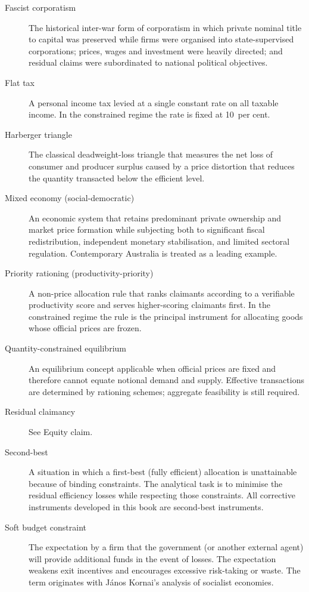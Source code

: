 \documentclass[12pt,anyside]{book}
\theoremstyle{definition}
\theoremstyle{plain}
\theoremstyle{remark}
\begin{document}
\begin{description}
\item[Fascist corporatism]  
The historical inter-war form of corporatism in which private nominal title to capital was preserved while firms were organised into state-supervised corporations; prices, wages and investment were heavily directed; and residual claims were subordinated to national political objectives.

\item[Flat tax]  
A personal income tax levied at a single constant rate on all taxable income. In the constrained regime the rate is fixed at 10~per cent.

\item[Harberger triangle]  
The classical deadweight-loss triangle that measures the net loss of consumer and producer surplus caused by a price distortion that reduces the quantity transacted below the efficient level.

\item[Mixed economy (social-democratic)]  
An economic system that retains predominant private ownership and market price formation while subjecting both to significant fiscal redistribution, independent monetary stabilisation, and limited sectoral regulation. Contemporary Australia is treated as a leading example.

\item[Priority rationing (productivity-priority)]  
A non-price allocation rule that ranks claimants according to a verifiable productivity score and serves higher-scoring claimants first. In the constrained regime the rule is the principal instrument for allocating goods whose official prices are frozen.

\item[Quantity-constrained equilibrium]  
An equilibrium concept applicable when official prices are fixed and therefore cannot equate notional demand and supply. Effective transactions are determined by rationing schemes; aggregate feasibility is still required.

\item[Residual claimancy]  
See Equity claim.

\item[Second-best]  
A situation in which a first-best (fully efficient) allocation is unattainable because of binding constraints. The analytical task is to minimise the residual efficiency losses while respecting those constraints. All corrective instruments developed in this book are second-best instruments.

\item[Soft budget constraint]  
The expectation by a firm that the government (or another external agent) will provide additional funds in the event of losses. The expectation weakens exit incentives and encourages excessive risk-taking or waste. The term originates with János Kornai’s analysis of socialist economies.


\end{description}
\end{document}
